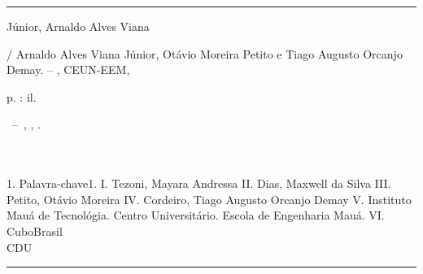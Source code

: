 \documentclass[
	12pt,				%
	openright,			%
	oneside,			%
	a4paper,			%
	english,			%
	french,				%
	spanish,			%
	brazil				%
	]{abntex2}
\begin{document}
\frenchspacing 


\imprimircapa

\imprimirfolhaderosto*


%
%     
\begin{fichacatalografica}
	\vspace*{\fill}					%
	\hrule							%
	\begin{center}					%
	\begin{minipage}[c]{12.5cm}		%
	
	Júnior, Arnaldo Alves Viana
	
	\hspace{0.5cm} \imprimirtitulo  / Arnaldo Alves Viana Júnior, Otávio Moreira Petito e Tiago Augusto Orcanjo Demay. --
	\imprimirlocal, CEUN-EEM, \imprimirdata
	
	\hspace{0.5cm} \pageref{LastPage} p. : il. \\
	
	\hspace{0.5cm}
	\parbox[t]{\textwidth}{\imprimirtipotrabalho~--~\imprimirinstituicao,
	\imprimirlocal, \imprimirdata.}\\
	
	\hspace{0.5cm} \imprimirorientadorRotulo~\imprimirorientador\\
	
	\hspace{0.5cm}
		1. Palavra-chave1.
		I. Tezoni, Mayara Andressa
		II. Dias, Maxwell da Silva
		III. Petito, Otávio Moreira
		IV. Cordeiro, Tiago Augusto Orcanjo Demay
		V. Instituto Mauá de Tecnológia. Centro Universitário. Escola de Engenharia Mauá.
		VI. CuboBrasil\\ 			
	
	\hspace{8.75cm} CDU \\
	
	\end{minipage}
	\end{center}
	\hrule
\end{fichacatalografica}
\end{document}
